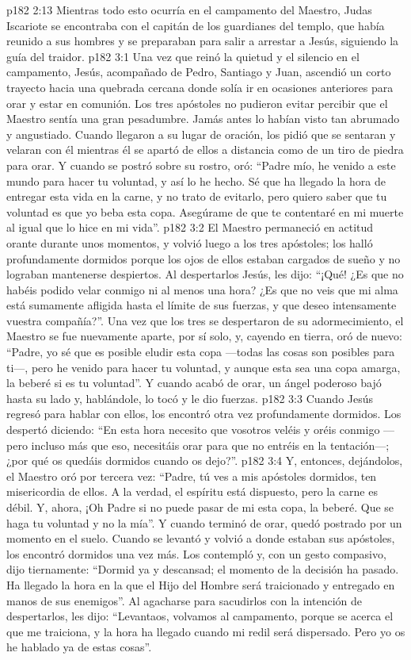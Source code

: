 \vs p182 2:13 \pc Mientras todo esto ocurría en el campamento del Maestro, Judas Iscariote se encontraba con el capitán de los guardianes del templo, que había reunido a sus hombres y se preparaban para salir a arrestar a Jesús, siguiendo la guía del traidor.
\vs p182 3:1 Una vez que reinó la quietud y el silencio en el campamento, Jesús, acompañado de Pedro, Santiago y Juan, ascendió un corto trayecto hacia una quebrada cercana donde solía ir en ocasiones anteriores para orar y estar en comunión. Los tres apóstoles no pudieron evitar percibir que el Maestro sentía una gran pesadumbre. Jamás antes lo habían visto tan abrumado y angustiado. Cuando llegaron a su lugar de oración, los pidió que se sentaran y velaran con él mientras él se apartó de ellos a distancia como de un tiro de piedra para orar. Y cuando se postró sobre su rostro, oró: “Padre mío, he venido a este mundo para hacer tu voluntad, y así lo he hecho. Sé que ha llegado la hora de entregar esta vida en la carne, y no trato de evitarlo, pero quiero saber que tu voluntad es que yo beba esta copa. Asegúrame de que te contentaré en mi muerte al igual que lo hice en mi vida”.
\vs p182 3:2 El Maestro permaneció en actitud orante durante unos momentos, y volvió luego a los tres apóstoles; los halló profundamente dormidos porque los ojos de ellos estaban cargados de sueño y no lograban mantenerse despiertos. Al despertarlos Jesús, les dijo: “¡Qué! ¿Es que no habéis podido velar conmigo ni al menos una hora? ¿Es que no veis que mi alma está sumamente afligida hasta el límite de sus fuerzas, y que deseo intensamente vuestra compañía?”. Una vez que los tres se despertaron de su adormecimiento, el Maestro se fue nuevamente aparte, por sí solo, y, cayendo en tierra, oró de nuevo: “Padre, yo sé que es posible eludir esta copa ---todas las cosas son posibles para ti---, pero he venido para hacer tu voluntad, y aunque esta sea una copa amarga, la beberé si es tu voluntad”. Y cuando acabó de orar, un ángel poderoso bajó hasta su lado y, hablándole, lo tocó y le dio fuerzas.
\vs p182 3:3 Cuando Jesús regresó para hablar con ellos, los encontró otra vez profundamente dormidos. Los despertó diciendo: “En esta hora necesito que vosotros veléis y oréis conmigo ---pero incluso más que eso, necesitáis orar para que no entréis en la tentación---; ¿por qué os quedáis dormidos cuando os dejo?”.
\vs p182 3:4 Y, entonces, dejándolos, el Maestro oró por tercera vez: “Padre, tú ves a mis apóstoles dormidos, ten misericordia de ellos. A la verdad, el espíritu está dispuesto, pero la carne es débil. Y, ahora, ¡Oh Padre si no puede pasar de mi esta copa, la beberé. Que se haga tu voluntad y no la mía”. Y cuando terminó de orar, quedó postrado por un momento en el suelo. Cuando se levantó y volvió a donde estaban sus apóstoles, los encontró dormidos una vez más. Los contempló y, con un gesto compasivo, dijo tiernamente: “Dormid ya y descansad; el momento de la decisión ha pasado. Ha llegado la hora en la que el Hijo del Hombre será traicionado y entregado en manos de sus enemigos”. Al agacharse para sacudirlos con la intención de despertarlos, les dijo: “Levantaos, volvamos al campamento, porque se acerca el que me traiciona, y la hora ha llegado cuando mi redil será dispersado. Pero yo os he hablado ya de estas cosas”.
